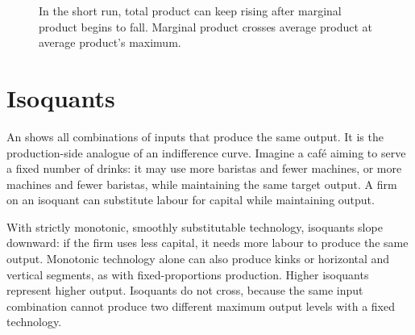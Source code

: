 \begin{figure}[!ht]
  \centering
  \caption{In the short run, total product can keep rising after marginal product begins to fall. Marginal product crosses average product at average product's maximum.}
  \label{fig:short-run-productivity}
\end{figure}
\FloatBarrier

\section{Isoquants}

An  shows all combinations of inputs that produce the same
output. It is the production-side analogue of an indifference curve. Imagine a
caf\'e aiming to serve a fixed number of drinks: it may use more baristas and
fewer machines, or more machines and fewer baristas, while maintaining the
same target output. A firm on an isoquant can substitute labour for capital
while maintaining output.

With strictly monotonic, smoothly substitutable technology, isoquants slope
downward: if the firm uses less capital, it needs more labour to produce the
same output. Monotonic technology alone can also produce kinks or horizontal
and vertical segments, as with fixed-proportions production. Higher isoquants
represent higher output. Isoquants do not cross, because the same input
combination cannot produce two different maximum output levels with a fixed
technology.

